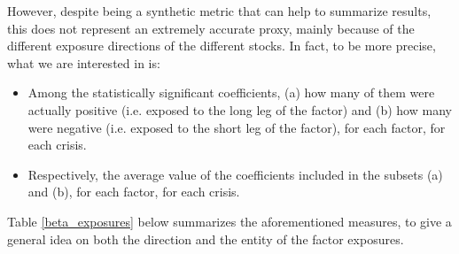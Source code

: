 \documentclass[12pt]{article}
\begin{document}
However, despite being a synthetic metric that can help to summarize results, this does not represent an extremely accurate proxy, mainly because of the different exposure directions of the different stocks. In fact, to be more precise, what we are interested in is:
\begin{itemize}
\item Among the statistically significant coefficients, (a) how many of them were actually positive (i.e. exposed to the long leg of the factor) and (b) how many were negative (i.e. exposed to the short leg of the factor), for each factor, for each crisis.
\item Respectively, the average value of the coefficients included in the subsets (a) and (b), for each factor, for each crisis.
\end{itemize}

Table \ref{beta_exposures} below summarizes the aforementioned measures, to give a general idea on both the direction and the entity of the factor exposures.
\end{document}
